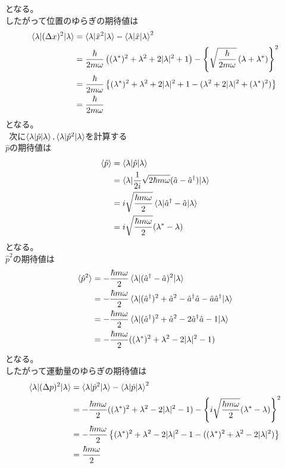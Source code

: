 \documentclass{jsarticle}  %
\numberwithin{equation}{section} %
\numberwithin{figure}{section}
\begin{document}
    となる。\\
    したがって位置のゆらぎの期待値は
    \begin{align}
        \braket{\lambda|(\Delta x)^2|\lambda} &= \braket{\lambda|\hat{x}^2 |\lambda} - \braket{\lambda|\hat{x}|\lambda}^2 \notag \\
        &= \frac{\hbar}{2m\omega} \left( (\lambda^*)^2 + \lambda^2 + 2|\lambda|^2 + 1\right) - \left\{ \sqrt{\frac{\hbar}{2m\omega}} \left( \lambda + \lambda^*\right) \right\}^2 \notag \\
        &= \frac{\hbar}{2m\omega}\left\{ (\lambda^*)^2 + \lambda^2 + 2|\lambda|^2 + 1 - (\lambda^2 + 2|\lambda|^2 + (\lambda^*)^2) \right\} \notag \\
        &= \frac{\hbar}{2m\omega}
    \end{align}
    となる。\\
    $\ \ $次に$\braket{\lambda|\hat{p}|\lambda},\braket{\lambda|\hat{p}^2|\lambda}$を計算する\\
    $\hat{p}$の期待値は
    \begin{align}
        \braket{\hat{p}} &= \braket{\lambda|\hat{p}|\lambda} \notag \\
        &= \braket{\lambda|\frac{1}{2i}\sqrt{2\hbar m\omega}(\hat{a} - \hat{a}^\dagger)|\lambda} \notag \\
        &=i\sqrt{\frac{\hbar m\omega}{2}} \braket{\lambda|\hat{a}^\dagger - \hat{a} |\lambda} \notag \\
        &= i\sqrt{\frac{\hbar m\omega}{2}}(\lambda^* - \lambda)
    \end{align}
    となる。\\
    $\hat{p}^2$の期待値は
    \begin{align}
        \braket{\hat{p}^2} &= -\frac{\hbar m\omega}{2}\braket{\lambda|(\hat{a}^\dagger - \hat{a})^2|\lambda} \notag \\
        &= -\frac{\hbar m\omega}{2}\braket{\lambda|(\hat{a}^\dagger)^2 + \hat{a}^2 - \hat{a}^\dagger \hat{a} - \hat{a}\hat{a}^\dagger|\lambda} \notag \\
        &= -\frac{\hbar m\omega}{2}\braket{\lambda|(\hat{a}^\dagger)^2 + \hat{a}^2 - 2\hat{a}^\dagger \hat{a} - 1|\lambda} \notag \\
        &= -\frac{\hbar m\omega}{2}((\lambda^*)^2 + \lambda^2 - 2|\lambda|^2 - 1)
    \end{align}
    となる。\\
    したがって運動量のゆらぎの期待値は
    \begin{align}
        \braket{\lambda|(\Delta p)^2|\lambda} &= \braket{\lambda|\hat{p}^2 |\lambda} - \braket{\lambda|\hat{p}|\lambda}^2 \notag \\
        &= -\frac{\hbar m\omega}{2}((\lambda^*)^2 + \lambda^2 - 2|\lambda|^2 - 1) - \left\{ i\sqrt{\frac{\hbar m\omega}{2}}(\lambda^* - \lambda) \right\}^2 \notag \\
        &= -\frac{\hbar m\omega}{2}\left\{ (\lambda^*)^2 + \lambda^2 - 2|\lambda|^2 - 1 -((\lambda^*)^2 + \lambda^2 - 2|\lambda|^2) \right\} \notag \\
        &= \frac{\hbar m\omega}{2}
    \end{align}
\end{document}
